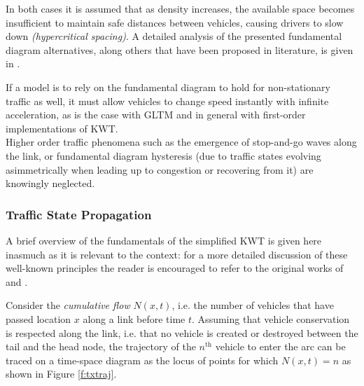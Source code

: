 In both cases it is assumed that as density increases, the available space becomes insufficient to maintain safe distances between vehicles, causing drivers to slow down \emph{(hypercritical spacing)}. A detailed analysis of the presented fundamental diagram alternatives, along others that have been proposed in literature, is given in \citep{tiddi2012models}.

If a model is to rely on the fundamental diagram to hold for non-stationary traffic as well, it must allow vehicles to change speed instantly with infinite acceleration, as is the case with GLTM and in general with first-order implementations of KWT. \\
Higher order traffic phenomena such as the emergence of stop-and-go waves along the link, or fundamental diagram hysteresis (due to traffic states evolving asimmetrically when leading up to congestion or recovering from it) are knowingly neglected.

\subsubsection{Traffic State Propagation} \label{s:cum}
A brief overview of the fundamentals of the simplified KWT is given here inasmuch as it is relevant to the context: for a more detailed discussion of these well-known principles the reader is encouraged to refer to the original works of \cite{yperman2007link} and \cite{gentile2010general}.

Consider the \emph{cumulative flow} $N(x,t)$,  i.e. the number of vehicles that have passed location $x$ along a link before time $t$. Assuming that vehicle conservation is respected along the link, i.e. that no vehicle is created or destroyed between the tail and the head node, the trajectory of the $n^{\mathrm{th}}$ vehicle to enter the arc can be traced on a time-space diagram as the locus of points for which $N(x,t) = n$ as shown in Figure \ref{f:txtraj}.


